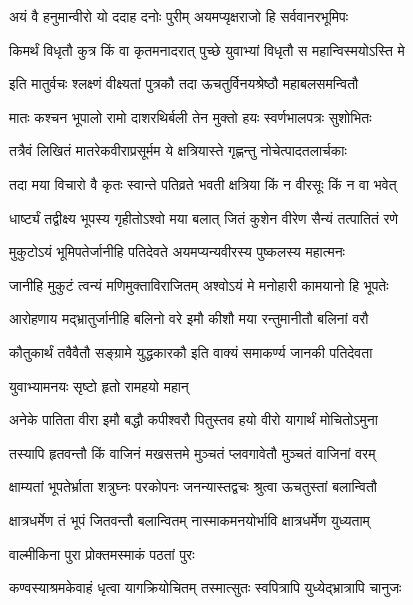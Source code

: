 \twolineshloka
{अयं वै हनुमान्वीरो यो ददाह दनोः पुरीम्}
{अयमप्यृक्षराजो हि सर्ववानरभूमिपः}%

\twolineshloka
{किमर्थं विधृतौ कुत्र किं वा कृतमनादरात्}
{पुच्छे युवाभ्यां विधृतौ स महान्विस्मयोऽस्ति मे}%

\twolineshloka
{इति मातुर्वचः श्लक्ष्णं वीक्ष्यतां पुत्रकौ तदा}
{ऊचतुर्विनयश्रेष्ठौ महाबलसमन्वितौ}%

\twolineshloka
{मातः कश्चन भूपालो रामो दाशरथिर्बली}
{तेन मुक्तो हयः स्वर्णभालपत्रः सुशोभितः}%

\twolineshloka
{तत्रैवं लिखितं मातरेकवीराप्रसूर्मम}
{ये क्षत्रियास्ते गृह्णन्तु नोचेत्पादतलार्चकाः}%

\twolineshloka
{तदा मया विचारो वै कृतः स्वान्ते पतिव्रते}
{भवती क्षत्रिया किं न वीरसूः किं न वा भवेत्}%

\twolineshloka
{धार्ष्ट्यं तद्वीक्ष्य भूपस्य गृहीतोऽश्वो मया बलात्}
{जितं कुशेन वीरेण सैन्यं तत्पातितं रणे}%

\twolineshloka
{मुकुटोऽयं भूमिपतेर्जानीहि पतिदेवते}
{अयमप्यन्यवीरस्य पुष्कलस्य महात्मनः}%

\twolineshloka
{जानीहि मुकुटं त्वन्यं मणिमुक्ताविराजितम्}
{अश्वोऽयं मे मनोहारी कामयानो हि भूपतेः}%

\twolineshloka
{आरोहणाय मद्भ्रातुर्जानीहि बलिनो वरे}
{इमौ कीशौ मया रन्तुमानीतौ बलिनां वरौ}%

\twolineshloka
{कौतुकार्थं तवैवैतौ सङ्ग्रामे युद्धकारकौ}
{इति वाक्यं समाकर्ण्य जानकी पतिदेवता}%



\onelineshloka
{युवाभ्यामनयः सृष्टो हृतो रामहयो महान्}%

\twolineshloka
{अनेके पातिता वीरा इमौ बद्धौ कपीश्वरौ}
{पितुस्तव हयो वीरो यागार्थं मोचितोऽमुना}%

\twolineshloka
{तस्यापि हृतवन्तौ किं वाजिनं मखसत्तमे}
{मुञ्चतं प्लवगावेतौ मुञ्चतं वाजिनां वरम्}%

\twolineshloka
{क्षाम्यतां भूपतेर्भ्राता शत्रुघ्नः परकोपनः}
{जनन्यास्तद्वचः श्रुत्वा ऊचतुस्तां बलान्वितौ}%

\twolineshloka
{क्षात्रधर्मेण तं भूपं जितवन्तौ बलान्वितम्}
{नास्माकमनयोर्भावि क्षात्रधर्मेण युध्यताम्}%

\onelineshloka
{वाल्मीकिना पुरा प्रोक्तमस्माकं पठतां पुरः}%

\twolineshloka
{कण्वस्याश्रमकेवाहं धृत्वा यागक्रियोचितम्}
{तस्मात्सुतः स्वपित्रापि युध्येद्भ्रात्रापि चानुजः}%

